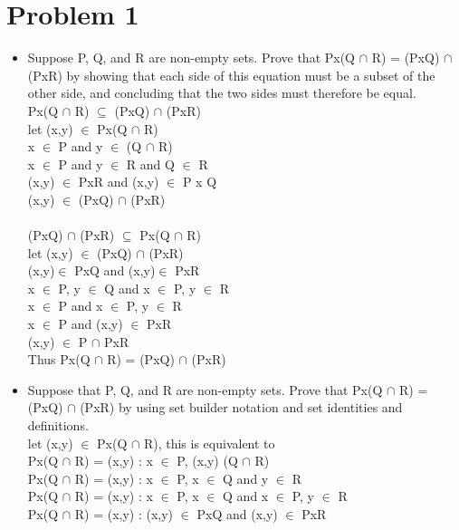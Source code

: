 \documentclass[12pt,letterpaper]{article}
\begin{document}
\section*{Problem 1}
\begin{itemize}
  \item Suppose P, Q, and R are non-empty sets. Prove that Px(Q \(\cap\) R) = (PxQ) \(\cap\) (PxR) by showing
        that each side of this equation must be a subset of the other side, and concluding that the two
        sides must therefore be equal.\\
        Px(Q \(\cap\) R) \(\subseteq\) (PxQ) \(\cap\) (PxR)\\
        let (x,y) \(\in\) Px(Q \(\cap\) R)\\
        x \(\in\)  P  and y \(\in\) (Q \(\cap\) R)\\
        x \(\in\)  P  and y \(\in\) R  and Q \(\in\) R\\
        (x,y) \(\in\)  PxR and  (x,y) \(\in\) P x Q\\
        (x,y) \(\in\) (PxQ) \(\cap\) (PxR)\\\\
        (PxQ) \(\cap\) (PxR) \(\subseteq\) Px(Q \(\cap\) R)\\
        let (x,y) \(\in\)  (PxQ) \(\cap\) (PxR)\\
        (x,y)\(\in\) PxQ and (x,y)\(\in\) PxR\\
        x \(\in\) P,  y \(\in\) Q  and x \(\in\) P, y \(\in\) R\\
        x \(\in\) P and x \(\in\) P, y \(\in\) R\\
        x \(\in\) P and (x,y) \(\in\) PxR\\
        (x,y) \(\in\) P \(\cap\) PxR\\
        Thus  Px(Q \(\cap\) R) = (PxQ) \(\cap\) (PxR)
  \item Suppose that P, Q, and R are non-empty sets. Prove that Px(Q \(\cap\) R) = (PxQ) \(\cap\) (PxR) by
        using set builder notation and set identities and definitions.\\
        let (x,y) \(\in\) Px(Q \(\cap\) R), this is equivalent to\\
        Px(Q \(\cap\) R) = {(x,y) : x \(\in\) P, (x,y) (Q \(\cap\) R)}\\
        Px(Q \(\cap\) R) = {(x,y) : x \(\in\) P, x \(\in\) Q and y \(\in\) R}\\
        Px(Q \(\cap\) R) = {(x,y) : x \(\in\) P, x \(\in\) Q and x \(\in\) P, y \(\in\) R}\\
        Px(Q \(\cap\) R) = {(x,y) : (x,y) \(\in\) PxQ and (x,y) \(\in\) PxR}\\

\end{itemize}
\end{document}

